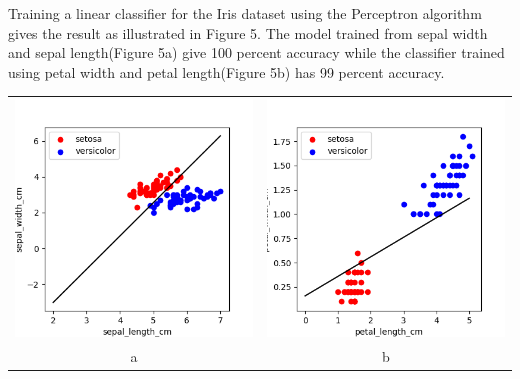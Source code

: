 \documentclass{article}
\begin{document}
Training a linear classifier for the Iris dataset using the Perceptron algorithm gives the result as illustrated in Figure 5. The model trained from sepal width and sepal length(Figure 5a) give 100 percent accuracy while the classifier trained using petal width and petal length(Figure 5b) has 99 percent accuracy.
\begin{center}
\begin{tabular}{cc}
\includegraphics[scale=0.35]{sepal_decision} &
\includegraphics[scale=0.35]{petal_decision} \\
\scriptsize a & \scriptsize b\\
\end{tabular}
\end{center}
\end{document}
